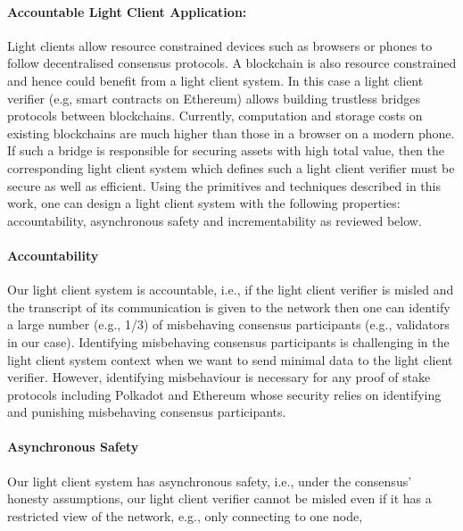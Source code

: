 \paragraph{Accountable Light Client Application:} %
Light clients allow resource constrained devices such as browsers or phones to follow decentralised consensus protocols. A blockchain is also resource constrained and hence could benefit from a light client system. In this case a light client verifier (e.g, smart contracts on
Ethereum) allows building trustless bridges protocols between blockchains. %
Currently, computation and storage costs on existing blockchains are much higher than those in a browser on a modern phone. If such a bridge is responsible for securing assets with high total value, then the corresponding light client system which defines such a light client verifier must be secure as well as efficient. Using the primitives and techniques described in this work, one can design a light client system with the following properties: accountability, asynchronous safety and incrementability as reviewed below.  \vspace{-0.2cm}
\noindent\paragraph{Accountability}Our light client system is accountable, i.e., if the light client verifier is misled and the transcript 
of its communication is given to the network then one can identify a large
number (e.g., 1/3) of misbehaving consensus participants (e.g., validators in our case). Identifying misbehaving consensus participants
is challenging in the light client system context when we want to send minimal data to the light client verifier. However,
identifying misbehaviour is necessary for any proof of stake protocols including Polkadot and Ethereum whose security relies on identifying and punishing misbehaving consensus participants.
\vspace{-0.2cm}
\noindent\paragraph{Asynchronous Safety}Our light client system has asynchronous safety, i.e., under the consensus' honesty assumptions, our light client verifier cannot be misled even if it has a restricted view of the network, e.g., only connecting to one node, 
